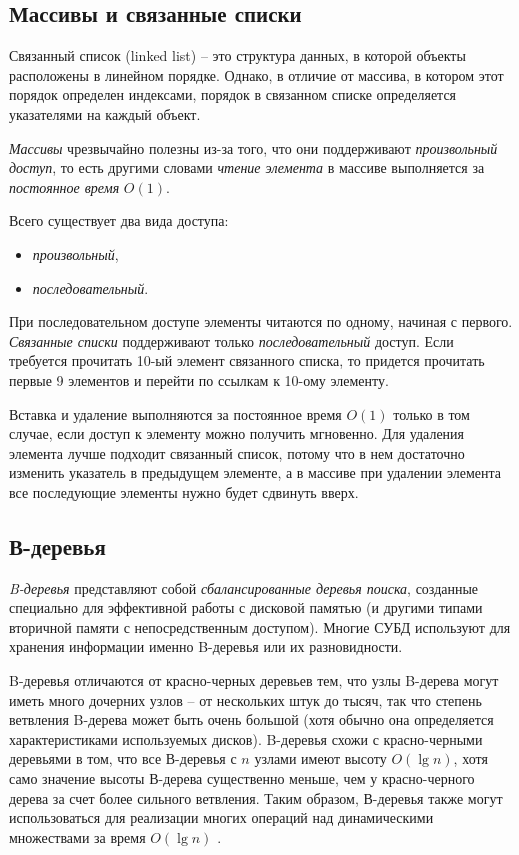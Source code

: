 \documentclass[%
	11pt,
	a4paper,
	utf8,
		]{article}
\begin{document}
\subsection{Массивы и связанные списки}

Связанный список (linked list) -- это структура данных, в которой объекты расположены в линейном порядке. Однако, в отличие от массива, в котором этот порядок определен индексами, порядок в связанном списке определяется указателями на каждый объект.

\emph{\color{blue}Массивы} чрезвычайно полезны из-за того, что они поддерживают \emph{\color{blue}произвольный доступ}, то есть другими словами \emph{чтение элемента} в массиве выполняется за \emph{постоянное время} $ O(1) $.

Всего существует два вида доступа:
\begin{itemize}
	\item \emph{произвольный},
	
	\item \emph{последовательный}.
\end{itemize}

При последовательном доступе элементы читаются по одному, начиная с первого. \emph{\color{blue}Связанные списки} поддерживают только \emph{\color{blue}последовательный} доступ. Если требуется прочитать 10-ый элемент связанного списка, то придется прочитать первые 9 элементов и перейти по ссылкам к 10-ому элементу.

Вставка и удаление выполняются за постоянное время $ O(1) $ только в том случае, если доступ к элементу можно получить мгновенно. Для удаления элемента лучше подходит связанный список, потому что в нем достаточно изменить указатель в предыдущем элементе, а в массиве при удалении элемента все последующие элементы нужно будет сдвинуть вверх.


\subsection{В-деревья}

\emph{B-деревья} представляют собой \emph{сбалансированные деревья поиска}, созданные специально для эффективной работы с дисковой памятью (и другими типами вторичной памяти с непосредственным доступом). Многие СУБД используют для хранения информации именно B-деревья или их разновидности.

B-деревья отличаются от красно-черных деревьев тем, что узлы B-дерева могут иметь много дочерних узлов -- от нескольких штук до тысяч, так что степень ветвления B-дерева может быть очень большой (хотя обычно она определяется характеристиками используемых дисков). B-деревья схожи с красно-черными деревьями в том, что все В-деревья с $ n $ узлами имеют высоту $ O(\lg n) $, хотя само значение высоты В-дерева существенно меньше, чем у красно-черного дерева за счет более сильного ветвления. Таким образом, В-деревья также могут использоваться для реализации многих операций над динамическими множествами за время $ O(\lg n) $ \cite[]{cormen-algo:2013}.
\end{document}
